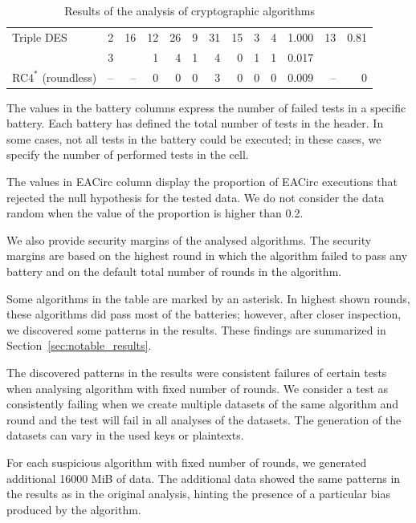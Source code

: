 \documentclass[
  digital,  	%
  color,		%
  oneside,   	%
  12pt,
  nocover,
  notable,
  nolof,
  nolot,
]{fithesis3}
\newcommand{\rd}{\cellcolor{red!40}}
\newcommand{\cone}{\cellcolor{lvl1}}
\newcommand{\cfour}{\cellcolor{lvl4}}
\theoremstyle{definition}
\theoremstyle{remark}
\begin{document}
\begin{table}[H]
\begin{nomar}
{\begin{tabular}{@{}lrrrrrrrrrrrr@{}}
Triple DES                       &  2 &  16 & 12    \rd & 26 \rd &  9 \rd   & 31    \rd & 15 \rd & 3 \rd & 4 \rd & 1.000 \rd & 13 & 0.81 \cone   \\
                                 &  3 &     &  1        &  4 \rd &  1       &  4    \rd &  0     & 1     & 1     & 0.017     &    &              \\ \midrule
RC$\text{4}^{\ast}$  (roundless) & -- & --  &  0        &  0     &  0       &  3        &  0     & 0     & 0     & 0.009     & -- & 0    \cfour  \\
\bottomrule
\end{tabular}
}

\end{nomar}
\caption{Results of the analysis of cryptographic algorithms}
\label{tab:crypto_alg_analysis}
\end{table}

The values in the battery columns express the number of failed tests in a specific battery. Each battery has defined the total number of tests in the header. In some cases, not all tests in the battery could be executed; in these cases, we specify the number of performed tests in the cell. 

The values in EACirc column display the proportion of EACirc executions that rejected the null hypothesis for the tested data. We do not consider the data random when the value of the proportion is higher than 0.2.

We also provide security margins of the analysed algorithms. The security margins are based on the highest round in which the algorithm failed to pass any battery and on the default total number of rounds in the algorithm.

Some algorithms in the table are marked by an asterisk. In highest shown rounds, these algorithms did pass most of the batteries; however, after closer inspection, we discovered some patterns in the results. These findings are summarized in Section~\ref{sec:notable_results}.

The discovered patterns in the results were consistent failures of certain tests when analysing algorithm with fixed number of rounds. We consider a test as consistently failing when we create multiple datasets of the same algorithm and round and the test will fail in all analyses of the datasets. The generation of the datasets can vary in the used keys or plaintexts.

For each suspicious algorithm with fixed number of rounds, we generated additional 16000 MiB of data. The additional data showed the same patterns in the results as in the original analysis, hinting the presence of a particular bias produced by the algorithm.
\end{document}
